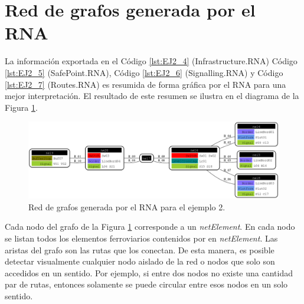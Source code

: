\section{Red de grafos generada por el RNA}
	
	La información exportada en el Código \ref{lst:EJ2_4} (Infrastructure.RNA) Código \ref{lst:EJ2_5} (SafePoint.RNA), Código \ref{lst:EJ2_6} (Signalling.RNA) y Código \ref{lst:EJ2_7} (Routes.RNA) es resumida de forma gráfica por el RNA para una mejor interpretación. El resultado de este resumen se ilustra en el diagrama de la Figura \ref{fig:EJ2_8}.
	
	\begin{figure}[H]
		\centering
		\includegraphics[width=1\textwidth]{Figuras/Graph_2}
		\centering\caption{Red de grafos generada por el RNA para el ejemplo 2.}
		\label{fig:EJ2_8}
	\end{figure}
	
		
	Cada nodo del grafo de la Figura \ref{fig:EJ2_8} corresponde a un \textit{netElement}. En cada nodo se listan todos los elementos ferroviarios contenidos por en \textit{netElement}. Las aristas del grafo son las rutas que los conectan. De esta manera, es posible detectar visualmente cualquier nodo aislado de la red o nodos que solo son accedidos en un sentido. Por ejemplo, si entre dos nodos no existe una cantidad par de rutas, entonces solamente se puede circular entre esos nodos en un solo sentido.